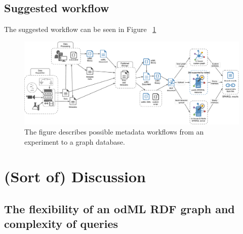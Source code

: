 \documentclass{article}
\begin{document}
\subsection{Suggested workflow} \label{sec:odml_rdf_workflow}

The suggested workflow can be seen in Figure ~\ref{fig:workflowSchema}

\begin{figure}
\begin{center}
\includegraphics[width=0.90\columnwidth]{figures/workflowSchema.pdf}
\caption{The figure describes possible metadata workflows from an experiment to a graph database.}
\label{fig:workflowSchema}
\end{center}
\end{figure}

\section{(Sort of) Discussion}

\subsection{The flexibility of an odML RDF graph and complexity of queries}
\end{document}
